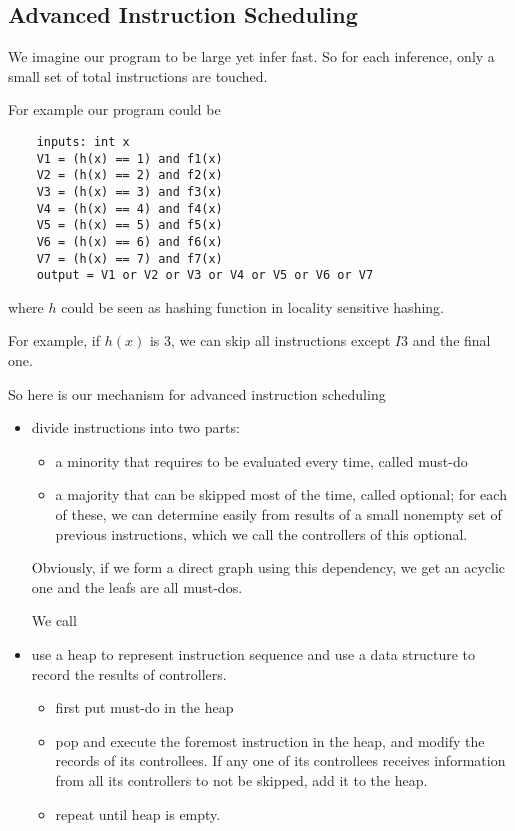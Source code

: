 \documentclass[10pt, oneside]{article}   	%
\theoremstyle{definition}
\begin{document}
\subsection{Advanced Instruction Scheduling}

We imagine our program to be large yet infer fast. So for each inference, only a small set of total instructions are touched.

For example our program could be
\begin{verbatim}
	inputs: int x
	V1 = (h(x) == 1) and f1(x)
	V2 = (h(x) == 2) and f2(x)
	V3 = (h(x) == 3) and f3(x)
	V4 = (h(x) == 4) and f4(x)
	V5 = (h(x) == 5) and f5(x)
	V6 = (h(x) == 6) and f6(x)
	V7 = (h(x) == 7) and f7(x)
	output = V1 or V2 or V3 or V4 or V5 or V6 or V7
\end{verbatim}

where $h$ could be seen as hashing function in locality sensitive hashing.

For example, if $h(x)$ is 3, we can skip all instructions except $I3$ and the final one.

So here is our mechanism for advanced instruction scheduling
\begin{itemize}
	\item divide instructions into two parts:
	\begin{itemize}
		\item a minority that requires to be evaluated every time, called must-do
		\item a majority that can be skipped most of the time, called optional; for each of these, we can determine easily from results of a small nonempty set of previous instructions, which we call the controllers of this optional.
	\end{itemize}

	Obviously, if we form a direct graph using this dependency, we get an acyclic one and the leafs are all must-dos.

	We call 

	\item use a heap to represent instruction sequence and use a data structure to record the results of controllers.
	\begin{itemize}
		\item first put must-do in the heap
		\item pop and execute the foremost instruction in the heap, and modify the records of its controllees. If any one of its controllees receives information from all its controllers to not be skipped, add it to the heap.
		\item repeat until heap is empty.
	\end{itemize}
\end{itemize}
\end{document}
